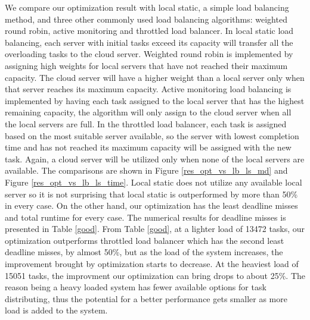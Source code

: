 We compare our optimization result with local static, a simple load balancing method, and three other commonly used load balancing algorithms: weighted round robin, active monitoring and throttled load balancer\cite{wrr}\cite{amt}\cite{amt2}. In local static load balancing, each server with initial tasks exceed its capacity will transfer all the overloading tasks to the cloud server. Weighted round robin is implemented by assigning high weights for local servers that have not reached their maximum capacity. The cloud server will have a higher weight than a local server only when that server reaches its maximum capacity. Active monitoring load balancing is implemented by having each task assigned to the local server that has the highest remaining capacity, the algorithm will only assign to the cloud server when all the local servers are full. In the throttled load balancer, each task is assigned based on the most suitable server available, so the server with lowest completion time and has not reached its maximum capacity will be assigned with the new task. Again, a cloud server will be utilized only when none of the local servers are available. The comparisons are shown in Figure \ref{res_opt_vs_lb_ls_md} and Figure \ref{res_opt_vs_lb_ls_time}. Local static does not utilize any available local server so it is not surprising that local static is outperformed by more than 50\% in every case. On the other hand, our optimization has the least deadline misses and total runtime for every case. The numerical results for deadline misses is presented in Table \ref{good}. From Table \ref{good}, at a lighter load of 13472 tasks, our optimization outperforms throttled load balancer which has the second least deadline misses, by almost 50\%, but as the load of the system increases, the improvement brought by optimization starts to decrease. At the heaviest load of 15051 tasks, the improvment our optimization can bring drops to about 25\%. The reason being a heavy loaded system has fewer available options for task distributing, thus the potential for a better performance gets smaller as more load is added to the system.




 



